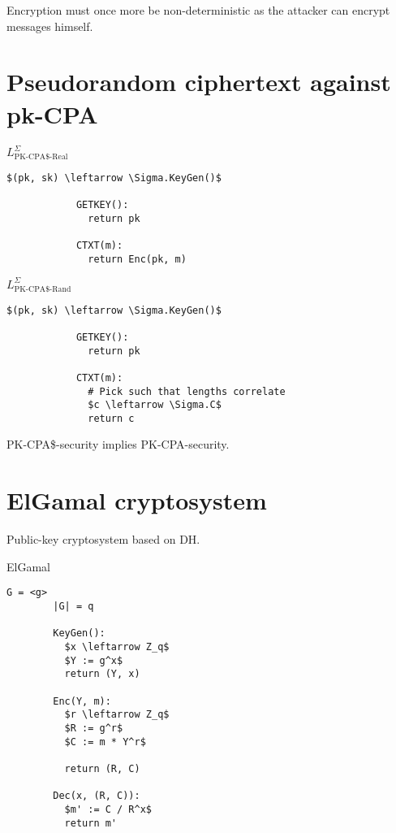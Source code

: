 \documentclass[a4paper]{scrreprt}
\begin{document}
Encryption must once more be non-deterministic as the attacker can encrypt
messages himself.

\section{Pseudorandom ciphertext against pk-CPA}

\begin{tcbraster}[raster columns=2,raster equal height,nobeforeafter,raster column skip=2cm]
	\begin{library}{$L^\Sigma_{\text{PK-CPA\$-Real}}$}
		\begin{lstlisting}[mathescape=true,autogobble=true]
			$(pk, sk) \leftarrow \Sigma.KeyGen()$

			GETKEY():
			  return pk

			CTXT(m):
			  return Enc(pk, m)
		\end{lstlisting}
	\end{library}
	\begin{library}{$L^\Sigma_{\text{PK-CPA\$-Rand}}$}
		\begin{lstlisting}[mathescape=true,autogobble=true]
			$(pk, sk) \leftarrow \Sigma.KeyGen()$

			GETKEY():
			  return pk

			CTXT(m):
			  # Pick such that lengths correlate
			  $c \leftarrow \Sigma.C$
			  return c
		\end{lstlisting}
	\end{library}
\end{tcbraster}

PK-CPA\$-security implies PK-CPA-security.

\section{ElGamal cryptosystem}

Public-key cryptosystem based on DH.

\begin{library}{ElGamal}
	\begin{lstlisting}[mathescape=true,autogobble=true]
		G = <g>
		|G| = q

		KeyGen():
		  $x \leftarrow Z_q$
		  $Y := g^x$
		  return (Y, x)

		Enc(Y, m):
		  $r \leftarrow Z_q$
		  $R := g^r$
		  $C := m * Y^r$

		  return (R, C)

		Dec(x, (R, C)):
		  $m' := C / R^x$
		  return m'
	\end{lstlisting}
\end{library}
\end{document}

